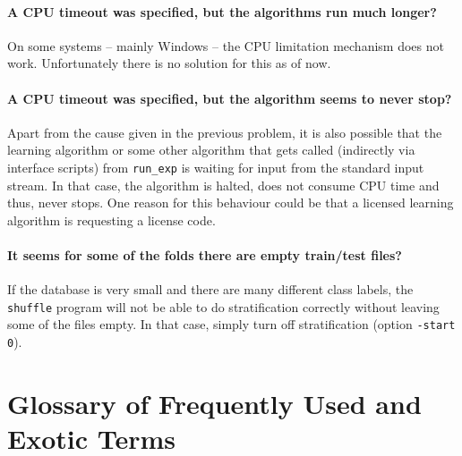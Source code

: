 \documentclass[a4paper,10pt,twoside]{article}
\begin{document}
\paragraph{A CPU timeout was specified, but the algorithms run much longer?}
On some systems -- mainly Windows -- the CPU limitation mechanism does not
work. Unfortunately there is no solution for this as of now.

\paragraph{A CPU timeout was specified, but the algorithm seems to never stop?}
Apart from the cause given in the previous problem, it is also possible
that the learning algorithm or some other algorithm that gets called
(indirectly via interface scripts) from \verb=run_exp= is waiting
for input from the standard input stream. In that case, the algorithm is
halted, does not consume CPU time and thus, never stops.
One reason for this behaviour could be that a licensed learning 
algorithm is requesting a license code.

\paragraph{It seems for some of the folds there are empty train/test files?}
If the database is very small and there are many different class labels,
the \verb=shuffle= program will not
be able to do stratification correctly without leaving some of 
the files empty. In that case, simply turn off stratification
(option \verb=-start 0=).


\section{Glossary of Frequently Used and Exotic Terms}
\end{document}
